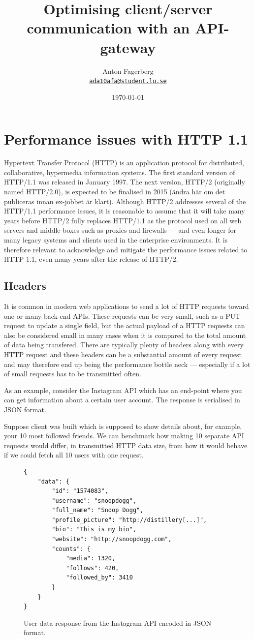 \documentclass{cslthse-msc}
\author{
	Anton Fagerberg \\
	{\normalsize \href{mailto:ada10afa@student.lu.se}{\texttt{ada10afa@student.lu.se}}}
}
\title{Optimising client/server communication with an API-gateway}
\subtitle{}
\date{\today}
\begin{document}
\makefrontmatter

\chapter{Performance issues with HTTP 1.1}
Hypertext Transfer Protocol (HTTP) is an application protocol for distributed, collaborative, hypermedia information systems\cite{http-info}. The first standard version of HTTP/1.1 was released in January 1997\cite{rfc2068}. The next version, HTTP/2 (originally named HTTP/2.0), is expected to be finalised in 2015 (ändra här om det publiceras innan ex-jobbet är klart). Although HTTP/2 addresses several of the HTTP/1.1 performance issues, it is reasonable to assume that it will take many years before HTTP/2 fully replaces HTTP/1.1 as the protocol used on all web servers and middle-boxes such as proxies and firewalls --- and even longer for many legacy systems and clients used in the enterprise environments. It is therefore relevant to  acknowledge and mitigate the performance issues related to HTTP 1.1, even many years after the release of HTTP/2.

\section{Headers}
\label{headers}

It is common in modern web applications to send a lot of HTTP requests toward one or many back-end APIs. These requests can be very small, such as a PUT request to update a single field, but the actual payload of a HTTP requests can also be considered small in many cases when it is compared to the total amount of data being transfered. There are typically plenty of headers along with every HTTP request and these headers can be a substantial amount of every request and may therefore end up being the performance bottle neck --- especially if a lot of small requests has to be transmitted often.

As an example, consider the Instagram API\cite{instagram_api} which has an end-point where you can get information about a certain user account. The response is serialised in JSON format. 

Suppose client was built which is supposed to show details about, for example, your 10 most followed friends. We can benchmark how making 10 separate API requests would differ, in transmitted HTTP data size, from how it would behave if we could fetch all 10 users with one request.

\begin{figure}[H]
  \centering
    \begin{lstlisting}
{
    "data": {
        "id": "1574083",
        "username": "snoopdogg",
        "full_name": "Snoop Dogg",
        "profile_picture": "http://distillery[...]",
        "bio": "This is my bio",
        "website": "http://snoopdogg.com",
        "counts": {
            "media": 1320,
            "follows": 420,
            "followed_by": 3410
        }
    }
}
    \end{lstlisting}
  \caption{User data response from the Instagram API encoded in JSON format.}
\end{figure}
\end{document}
